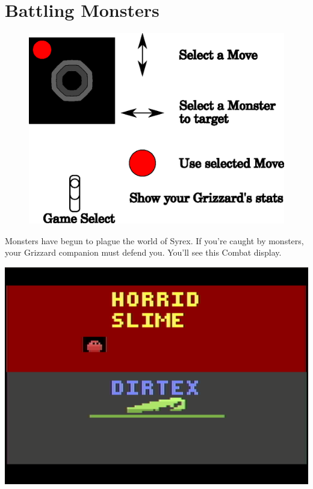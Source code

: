 \documentclass[10pt,twocolumn,openany,article]{memoir}
\begin{document}
\ifdefined\ATARIAGESAVE
\pagebreak
\fi

\section{Battling Monsters}

\begin{figure}[t]
  \begin{center}
    \includegraphics[width=2\columnwidth]{../Manual/CombatControls.eps}
  \end{center}
\end{figure}

Monsters have  begun to plague the  world of Syrex. If  you're caught by
monsters,  your Grizzard  companion  must defend  you.  You'll see  this
Combat display.

\begin{center}
  \includegraphics[width=\columnwidth]{../Manual/MonsterCombatNTSC.png}
\end{center}
\end{document}
